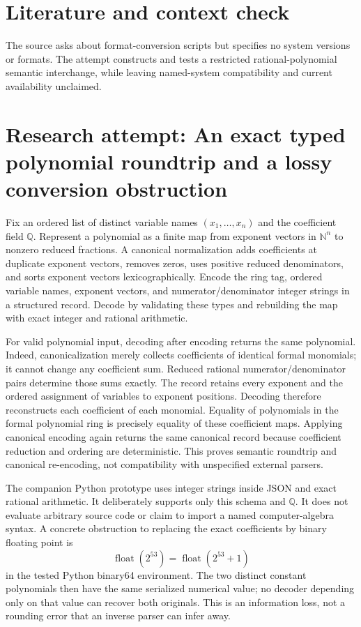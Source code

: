\documentclass[11pt]{article}
\begin{document}
\section{Literature and context check}
The source asks about format-conversion scripts but specifies no system versions or formats. The attempt constructs and tests a restricted rational-polynomial semantic interchange, while leaving named-system compatibility and current availability unclaimed.
\section{Research attempt: An exact typed polynomial roundtrip and a lossy conversion obstruction}
Fix an ordered list of distinct variable names $(x_1,\ldots,x_n)$ and the coefficient field $\mathbb Q$. Represent a polynomial as a finite map from exponent vectors in $\mathbb N^n$ to nonzero reduced fractions. A canonical normalization adds coefficients at duplicate exponent vectors, removes zeros, uses positive reduced denominators, and sorts exponent vectors lexicographically. Encode the ring tag, ordered variable names, exponent vectors, and numerator/denominator integer strings in a structured record. Decode by validating these types and rebuilding the map with exact integer and rational arithmetic.

For valid polynomial input, decoding after encoding returns the same polynomial. Indeed, canonicalization merely collects coefficients of identical formal monomials; it cannot change any coefficient sum. Reduced rational numerator/denominator pairs determine those sums exactly. The record retains every exponent and the ordered assignment of variables to exponent positions. Decoding therefore reconstructs each coefficient of each monomial. Equality of polynomials in the formal polynomial ring is precisely equality of these coefficient maps. Applying canonical encoding again returns the same canonical record because coefficient reduction and ordering are deterministic. This proves semantic roundtrip and canonical re-encoding, not compatibility with unspecified external parsers.

The companion Python prototype uses integer strings inside JSON and exact rational arithmetic. It deliberately supports only this schema and $\mathbb Q$. It does not evaluate arbitrary source code or claim to import a named computer-algebra syntax. A concrete obstruction to replacing the exact coefficients by binary floating point is
\[
\operatorname{float}(2^{53})=\operatorname{float}(2^{53}+1)
\]
in the tested Python binary64 environment. The two distinct constant polynomials then have the same serialized numerical value; no decoder depending only on that value can recover both originals. This is an information loss, not a rounding error that an inverse parser can infer away.
\end{document}
